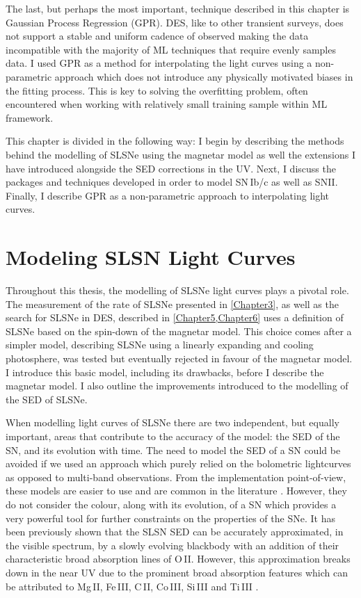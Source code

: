 The last, but perhaps the most important, technique described in this chapter is Gaussian Process Regression (GPR). DES, like to other transient surveys, does not support a stable and uniform cadence of observed making the data incompatible with the majority of ML techniques that require evenly samples data. I used GPR as a method for interpolating the light curves using a non-parametric approach which does not introduce any physically motivated biases in the fitting process. This is key to solving the overfitting problem, often encountered when working with relatively small training sample within ML framework.

This chapter is divided in the following way: I begin by describing the methods behind the modelling of SLSNe using the magnetar model as well the extensions I have introduced alongside the SED corrections in the UV. Next, I discuss the packages and techniques developed in order to model SN\,Ib/c as well as SNII. Finally, I describe GPR as a non-parametric approach to interpolating light curves.

\section{Modeling SLSN Light Curves} \label{sec:SLAP}
Throughout this thesis, the modelling of SLSNe light curves plays a pivotal role. The measurement of the rate of SLSNe presented in \cref{Chapter3}, as well as the search for SLSNe in DES, described in \cref{Chapter5,Chapter6} uses a definition of SLSNe based on the spin-down of the magnetar model. This choice comes after a simpler model, describing SLSNe using a linearly expanding and cooling photosphere, was tested but eventually rejected in favour of the magnetar model. I introduce this basic model, including its drawbacks, before I describe the magnetar model. I also outline the improvements introduced to the modelling of the SED of SLSNe.

When modelling light curves of SLSNe there are two independent, but equally important, areas that contribute to the accuracy of the model: the SED of the SN, and its evolution with time. The need to model the SED of a SN could be avoided if we used an approach which purely relied on the bolometric lightcurves as opposed to multi-band observations. From the implementation point-of-view, these models are easier to use and are common in the literature \citep{Inserra2013,Papadopuplus2014,Nicholl2014}. However, they do not consider the colour, along with its evolution, of a SN which provides a very powerful tool for further constraints on the properties of the SNe. It has been previously shown \citep{Chomniuk2011,Howell2013,Papadopuplus2014,Vreeswijk2014} that the SLSN SED can be accurately approximated, in the visible spectrum, by a slowly evolving blackbody with an addition of their characteristic broad absorption lines of O\,II. However, this approximation breaks down in the near UV due to the prominent broad absorption features which can be attributed to Mg\,II, Fe\,III, C\,II, Co\,III, Si\,III and Ti\,III \citep[see][for line identifications]{Mazalli2016}.

